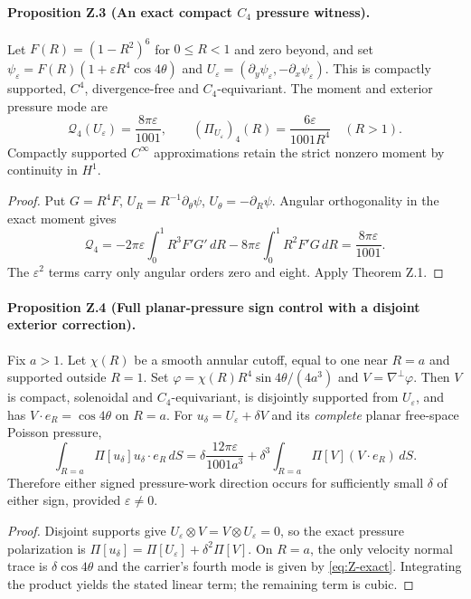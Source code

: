 \paragraph{Proposition Z.3 (An exact compact $C_4$ pressure witness).}
Let $F(R)=(1-R^2)^6$ for $0\le R<1$ and zero beyond, and set
$\psi_\varepsilon=F(R)(1+\varepsilon R^4\cos4\theta)$ and
$U_\varepsilon=(\partial_y\psi_\varepsilon,-\partial_x\psi_\varepsilon)$.
This is compactly supported, $C^4$, divergence-free and $C_4$-equivariant. The moment and exterior pressure mode are
\begin{equation}\label{eq:Z-exact}
\boxed{\mathcal Q_4(U_\varepsilon)=\frac{8\pi\varepsilon}{1001},\qquad
(\Pi_{U_\varepsilon})_4(R)=\frac{6\varepsilon}{1001R^4}\quad(R>1).}
\end{equation}
Compactly supported $C^\infty$ approximations retain the strict nonzero moment by continuity in $H^1$.
\begin{proof}
Put $G=R^4F$, $U_R=R^{-1}\partial_\theta\psi$, $U_\theta=-\partial_R\psi$. Angular orthogonality in the exact moment gives
\[
\mathcal Q_4=-2\pi\varepsilon\int_0^1R^3F'G'\,dR
-8\pi\varepsilon\int_0^1R^2F'G\,dR
=\frac{8\pi\varepsilon}{1001}.
\]
The $\varepsilon^2$ terms carry only angular orders zero and eight. Apply Theorem Z.1. \end{proof}

\paragraph{Proposition Z.4 (Full planar-pressure sign control with a disjoint exterior correction).}
Fix $a>1$. Let $\chi(R)$ be a smooth annular cutoff, equal to one near $R=a$ and supported outside $R=1$. Set
$\varphi=\chi(R)R^4\sin4\theta/(4a^3)$ and $V=\nabla^\perp\varphi$.
Then $V$ is compact, solenoidal and $C_4$-equivariant, is disjointly supported from $U_\varepsilon$, and has $V\cdot e_R=\cos4\theta$ on $R=a$. For $u_\delta=U_\varepsilon+\delta V$ and its \emph{complete} planar free-space Poisson pressure,
\begin{equation}\label{eq:Z-full}
\boxed{\int_{R=a}\Pi[u_\delta]u_\delta\cdot e_R\,dS
=\delta\frac{12\pi\varepsilon}{1001a^3}
+\delta^3\int_{R=a}\Pi[V](V\cdot e_R)\,dS.}
\end{equation}
Therefore either signed pressure-work direction occurs for sufficiently small $\delta$ of either sign, provided $\varepsilon\ne0$.
\begin{proof}
Disjoint supports give $U_\varepsilon\otimes V=V\otimes U_\varepsilon=0$, so the exact pressure polarization is $\Pi[u_\delta]=\Pi[U_\varepsilon]+\delta^2\Pi[V]$. On $R=a$, the only velocity normal trace is $\delta\cos4\theta$ and the carrier's fourth mode is given by \eqref{eq:Z-exact}. Integrating the product yields the stated linear term; the remaining term is cubic. \end{proof}

